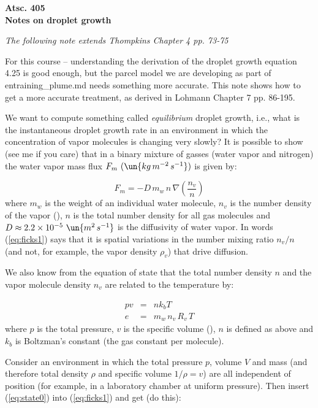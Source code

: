 \documentclass[12pt]{article}
\begin{document}
\begin{center}
{\bf
Atsc. 405\\
Notes on droplet growth\\
 }
\end{center}


\textit{The following note extends Thompkins Chapter 4 pp. 73-75}

For this course -- understanding the derivation of the droplet growth equation
4.25 is good enough, but the parcel model we are developing as part of entraining\_plume.md needs
something more accurate.   This note shows how to get a more accurate treatment, as derived in
Lohmann Chapter 7 pp. 86-195.

We want to compute something called \textit{equilibrium} droplet
growth, i.e., what is the instantaneous droplet growth rate in an
environment in which the concentration of vapor molecules is changing
very slowly?  It is possible to show (see me if you care) that in a
binary mixture of gasses (water vapor and nitrogen) the water vapor
mass flux $F_m\ (\un{kg\,m^{-2}\,s^{-1}})$ is given by:

\begin{equation}
  \label{eq:ficks1}
  F_m = -D\, m_w\, n\, \nabla \left (\frac{n_v}{n} \right )
\end{equation}
where $m_w$ is the weight of an individual water molecule, $n_v$ is
the number density of the vapor (),
$n$ is the total number density for all gas molecules
and  $D \approx
2.2 \times 10^{-5}~\un{m^2\,s^{-1}}$ is the diffusivity of water vapor.
In words (\ref{eq:ficks1}) says that it is spatial variations in
the number mixing ratio $n_v/n$ (and not, for example, the vapor
density $\rho_v$) that drive diffusion.

We also know from the equation of state that the total number density
$n$ and the vapor molecule density $n_v$ are related to the temperature by:

\begin{eqnarray}
  \label{eq:state0}
  p v &=& n k_b T\nonumber\\
  e &=& m_w\, n_v\, R_v\, T
\end{eqnarray}
where $p$  is the total pressure, $v$ is the specific volume (),
$n$ is defined as above and $k_b$ is Boltzman's constant (the gas constant per molecule).

Consider an environment in which the total pressure $p$, volume $V$
and mass (and therefore total density $\rho$ and specific volume
$1/\rho = v$) are all independent of position (for example, in a
laboratory chamber at uniform pressure).  Then insert (\ref{eq:state0}) into
(\ref{eq:ficks1}) and get (do this):
\end{document}
